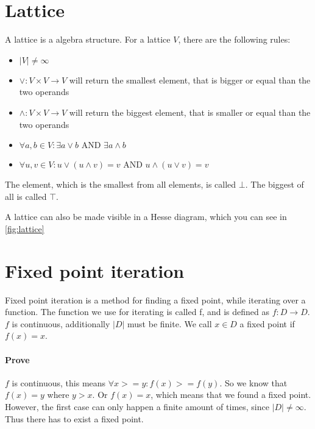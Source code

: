 \section{Lattice}
A lattice is a algebra structure. For a lattice $V$, there are the following rules:
\begin{itemize}
	\item $|V| \not= \infty $
	\item $\vee: V \times V \rightarrow V$ will return the smallest element, that is bigger or equal than the two operands
	\item $\wedge: V \times V \rightarrow V$ will return the biggest element, that is smaller or equal than the two operands
	\item $\forall a,b \in V : \exists a \vee b \text{ AND } \exists a \wedge b$
	\item $\forall u,v \in V : u \vee ( u \wedge v) = v \text{ AND } u \wedge ( u \vee v ) = v$
\end{itemize}

The element, which is the smallest from all elements, is called $\bot$. The biggest of all is called $\top$.

A lattice can also be made visible in a Hesse diagram, which you can see in \autoref{fig:lattice}

\section{Fixed point iteration}
Fixed point iteration is a method for finding a fixed point, while iterating over a function. \newline
The function we use for iterating is called f, and is defined as $f: D \rightarrow D$. $f$ is continuous, additionally $|D|$ must be finite. We call $x \in D$ a fixed point if $f(x)=x$.

\paragraph{Prove}$f$ is continuous, this means $\forall x >= y: f(x) >= f(y)$. So we know that $f(x) = y$ where $y > x$. Or $f(x) = x$, which means that we found a fixed point. However, the first case can only happen a finite amount of times, since $|D| \not= \infty$. Thus there has to exist a fixed point.

